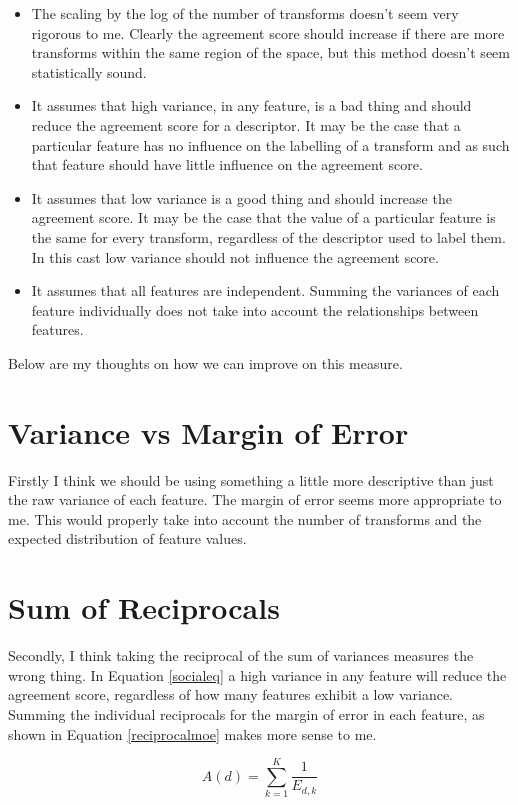 \documentclass[a4paper]{article}
\begin{document}
	\begin{itemize}
		\item The scaling by the log of the number of transforms doesn't seem very rigorous to me. Clearly the
			agreement score should increase if there are more transforms within the same region of the space,
			but this method doesn't seem statistically sound.
		\item It assumes that high variance, in any feature, is a bad thing and should reduce the agreement
			score for a descriptor. It may be the case that a particular feature has no influence on the
			labelling of a transform and as such that feature should have little influence on the agreement
			score.
		\item It assumes that low variance is a good thing and should increase the agreement score. It may be the
			case that the value of a particular feature is the same for every transform, regardless of the
			descriptor used to label them. In this cast low variance should not influence the agreement score.
		\item It assumes that all features are independent. Summing the variances of each feature individually does
			not take into account the relationships between features. 
	\end{itemize}

Below are my thoughts on how we can improve on this measure.

\section*{Variance vs Margin of Error}
Firstly I think we should be using something a little more descriptive than just the raw variance of each feature. The
margin of error seems more appropriate to me. This would properly take into account the number of transforms and the
expected distribution of feature values.

\section*{Sum of Reciprocals}
Secondly, I think taking the reciprocal of the sum of variances measures the wrong thing. In Equation \ref{socialeq} a high
variance in any feature will reduce the agreement score, regardless of how many features exhibit a low variance. Summing the
individual reciprocals for the margin of error in each feature, as shown in Equation \ref{reciprocalmoe} makes more sense to
me.

	\begin{equation}
		A(d) = \sum_{k=1}^{K} \frac{1}{E_{d,k}}
		\label{reciprocalmoe}
	\end{equation}
\end{document}
